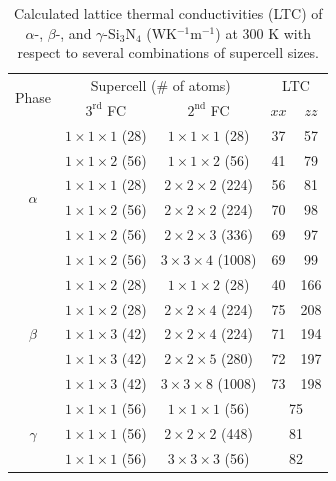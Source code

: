 \documentclass[twocolumn,amsmath,amssymb,a4paper,prb,superscriptaddress,floatfix]{revtex4-1}
\begin{document}
\begin{table}[ht]
 \caption{\label{table:LTC} Calculated lattice thermal conductivities
 (LTC) of $\alpha$-, $\beta$-, and $\gamma$-Si$_3$N$_4$
 (WK$^{-1}$m$^{-1}$) at 300 K with respect to several combinations of
 supercell sizes.}
 \begin{ruledtabular}
  \begin{tabular}{ccccc}
   \multirow{2}{*}{Phase}
   & \multicolumn{2}{c}{Supercell (\# of atoms)} &
   \multicolumn{2}{c}{LTC} \\
   \cline{2-5}
   & $3^\text{rd}$ FC & $2^\text{nd}$ FC & $xx$ & $zz$ \\
   \hline
   \multirow{6}{*}{$\alpha$}
   & $1\times 1\times 1$ (28) & $1\times
   1\times 1$ (28) & 37 &   57 \\ 
   & $1\times 1\times 2$ (56) & $1\times
   1\times 2$ (56) & 41 &   79 \\ 
   & $1\times 1\times 1$ (28) & $2\times
   2\times 2$ (224) & 56 &   81 \\ 
   & $1\times 1\times 2$ (56) & $2\times
   2\times 2$ (224) & 70 &   98 \\ 
   & $1\times 1\times 2$ (56) & $2\times
   2\times 3$ (336) & 69 &   97 \\ 
   & $1\times 1\times 2$ (56) & $3\times
   3\times 4$ (1008) & 69 &   99 \\ 
   \hline
   \multirow{5}{*}{$\beta$}
   & $1\times 1\times 2$ (28) & $1\times
   1\times 2$ (28) & 40 &   166 \\ 
   & $1\times 1\times 2$ (28) & $2\times
   2\times 4$ (224) & 75 &  208 \\ 
   & $1\times 1\times 3$ (42) & $2\times
   2\times 4$ (224) & 71 &  194 \\ 
   & $1\times 1\times 3$ (42) & $2\times
   2\times 5$ (280) & 72 &  197 \\ 
   & $1\times 1\times 3$ (42) & $3\times
   3\times 8$ (1008) & 73 &  198 \\ 
   \hline
   \multirow{3}{*}{$\gamma$}
   & $1\times 1\times 1$ (56) & $1\times
   1\times 1$ (56) & \multicolumn{2}{c}{75} \\ 
   & $1\times 1\times 1$ (56) & $2\times
   2\times 2$ (448) & \multicolumn{2}{c}{81} \\ 
   & $1\times 1\times 1$ (56) & $3\times
   3\times 3$ (56) & \multicolumn{2}{c}{82} \\ 
  \end{tabular}
 \end{ruledtabular}
\end{table}
\end{document}
